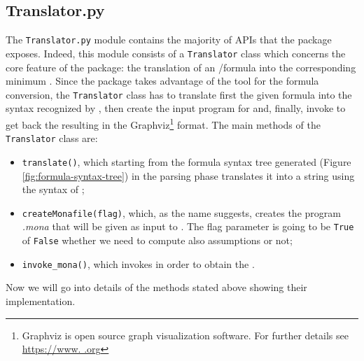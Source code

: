 \subsection{Translator.py}
The \texttt{Translator.py} module contains the majority of APIs that the \LTLfToDFA package exposes. Indeed, this module consists of a \texttt{Translator} class which concerns the core feature of the package: the translation of an \LTLf/\PLTL  formula into the corresponding minimum \DFA. Since the package takes advantage of the \MONA tool for the formula conversion, the \texttt{Translator} class has to translate first the given formula into the syntax recognized by \MONA, then create the input program for \MONA and, finally, invoke \MONA to get back the resulting \DFA in the Graphviz\footnote{Graphviz is open source graph visualization software. For further details see \href{https://www.graphviz.org}{https://www.  .org}} format. 
The main methods of the \texttt{Translator} class are:
\begin{itemize}
\item \texttt{translate()}, which starting from the formula syntax tree generated (Figure \ref{fig:formula-syntax-tree}) in the parsing phase translates it into a string using the syntax of \MONA;
\item \texttt{createMonafile(flag)}, which, as the name suggests, creates the program \textit{.mona} that will be given as input to \MONA. The flag parameter is going to be \texttt{True} of \texttt{False} whether we need to compute also \declare  assumptions or not;
\item \texttt{invoke\_mona()}, which invokes \MONA in order to obtain the \DFA.
\end{itemize}
Now we will go into details of the methods stated above showing their implementation.
